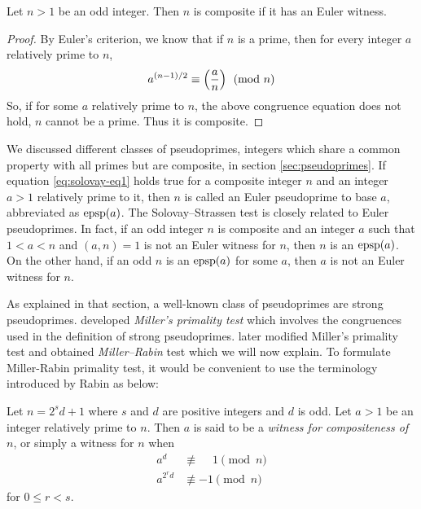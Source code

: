 	\begin{theorem}
		Let $n>1$ be an odd integer. Then $n$ is composite if it has an Euler witness.
	\end{theorem}

	\begin{proof}
		By Euler's criterion, we know that if $n$ is a prime, then for every integer $a$ relatively prime to $n$,
			\begin{align}
				a^{(n-1)/2}  \equiv \left(\dfrac{a}{n}\right) \pmod n \label{eq:solovay-eq1}
			\end{align}
		So, if for some $a$ relatively prime to $n$, the above congruence equation does not hold, $n$ cannot be a prime. Thus it is composite.
	\end{proof}

	\begin{remark}
				We discussed different classes of pseudoprimes, integers which share a common property with all primes but are composite, in section \eqref{sec:pseudoprimes}. If equation \eqref{eq:solovay-eq1} holds true for a composite integer $n$ and an integer $a>1$ relatively prime to it, then $n$ is called an Euler pseudoprime to base $a$, abbreviated as $\operatorname{epsp}(a)$. The Solovay--Strassen test is closely related to Euler pseudoprimes. In fact, if an odd integer $n$ is composite and an integer $a$ such that $1<a<n$ and $(a,n)=1$ is not an Euler witness for $n$, then $n$ is an $\operatorname{epsp}(a)$. On the other hand, if an odd $n$ is an $\operatorname{epsp}(a)$ for some $a$, then $a$ is not an Euler witness for $n$.
	\end{remark}

As explained in that section, a well-known class of pseudoprimes are strong pseudoprimes. \textcite{miller_1975} developed \textit{Miller's primality test} which involves the congruences used in the definition of strong pseudoprimes. \textcite{rabin_1980} later modified Miller's primality test and obtained \textit{Miller--Rabin} test which we will now explain. To formulate Miller-Rabin primality test, it would be convenient to use the terminology introduced by Rabin as below:

	\begin{definition}
		Let $n=2^sd+1$ where $s$ and $d$ are positive integers and $d$ is odd. Let $a>1$ be an integer relatively prime to $n$. Then $a$ is said to be a \textit{witness for compositeness of $n$}, or simply a witness for $n$ when
			\begin{align*}
			a^d &\not\equiv \phantom{-} 1 \pmod n\\
			a^{2^rd} &\not\equiv -1 \pmod n
			\end{align*}
		for $0\leq r<s$.
	\end{definition}

